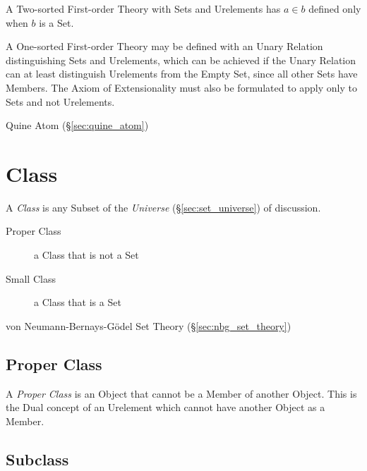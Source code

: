 A Two-sorted First-order Theory with Sets and Urelements has $a \in b$
defined only when $b$ is a Set.

A One-sorted First-order Theory may be defined with an Unary Relation
distinguishing Sets and Urelements, which can be achieved if the Unary
Relation can at least distinguish Urelements from the Empty Set, since
all other Sets have Members. The Axiom of Extensionality must also be
formulated to apply only to Sets and not Urelements.

Quine Atom (\S\ref{sec:quine_atom})



\section{Class}\label{sec:class}

A \emph{Class} is any Subset of the \emph{Universe} (\S\ref{sec:set_universe})
of discussion.

\begin{description}
  \item [Proper Class] a Class that is not a Set
  \item [Small Class] a Class that is a Set
\end{description}

\fist von Neumann-Bernays-G\"odel Set Theory (\S\ref{sec:nbg_set_theory})



\subsection{Proper Class}\label{sec:proper_class}

A \emph{Proper Class} is an Object that cannot be a Member of another Object.
This is the Dual concept of an Urelement which cannot have another Object as a
Member.



\subsection{Subclass}\label{sec:subclass}

